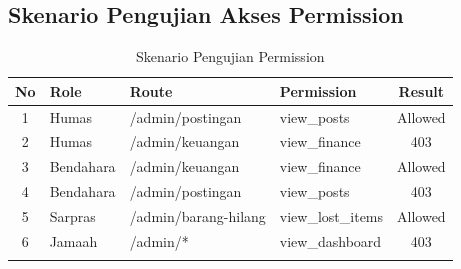 \documentclass[12pt,a4paper]{article}
\begin{document}
\subsection{Skenario Pengujian Akses Permission}
\begin{longtable}{|c|l|l|l|c|}
\hline
\textbf{No} & \textbf{Role} & \textbf{Route} & \textbf{Permission} & \textbf{Result} \\
\hline
1 & Humas & /admin/postingan & view\_posts & Allowed \\
2 & Humas & /admin/keuangan & view\_finance & 403 \\
3 & Bendahara & /admin/keuangan & view\_finance & Allowed \\
4 & Bendahara & /admin/postingan & view\_posts & 403 \\
5 & Sarpras & /admin/barang-hilang & view\_lost\_items & Allowed \\
6 & Jamaah & /admin/* & view\_dashboard & 403 \\
\hline
\caption{Skenario Pengujian Permission}
\end{longtable}

\newpage

\appendix
\end{document}
